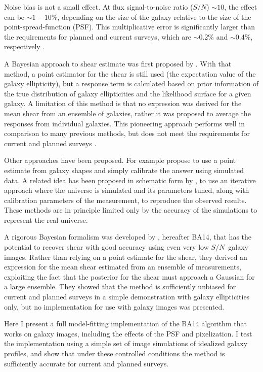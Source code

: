 \documentclass[12pt,preprint]{aastex}
\newcommand{\sn}{$S/N$}
\begin{document}
Noise bias is not a small effect.  At flux signal-to-noise ratio (\sn) $\sim
10$, the effect can be $\sim1-10$\%, depending on the size of the galaxy
relative to the size of the point-spread-function (PSF).  This multiplicative
error is significantly larger than the requirements for planned and current
surveys, which are $\sim$0.2\% and $\sim$0.4\%, respectively
\citep{HutererSystematics06}.

A Bayesian approach to shear estimate was first proposed by \cite{Miller07}.
With that method, a point estimator for the shear is still used (the
expectation value of the galaxy ellipticity), but a response term is calculated
based on prior information of the true distribution of galaxy ellipticities and
the likelihood surface for a given galaxy.  A limitation of this method is that
no expression was derived for the mean shear from an ensemble of galaxies,
rather it was proposed to average the responses from individual galaxies.  This
pioneering approach performs well in comparison to many previous methods, but
does not meet the requirements for current and planned surveys \citep{ba14}.

Other approaches have been proposed. For example \cite{Zuntz13} propose to use
a point estimate from galaxy shapes and simply calibrate the answer using
simulated data.  A related idea has been proposed in schematic form by
\cite{Refregier13}, to use an iterative approach where the universe is
simulated and its parameters tuned, along with calibration parameters of the
measurement, to reproduce the observed results.  These methods are in principle
limited only by the accuracy of the simulations to represent the real universe.

A rigorous Bayesian formalism was developed by \cite{ba14}, hereafter BA14,
that has the potential to recover shear with good accuracy using even very low
\sn\ galaxy images.  Rather than relying on a point estimate for the shear,
they derived an expression for the mean shear estimated from an ensemble of
measurements, exploiting the fact that the posterior for the shear must
approach a Gaussian for a large ensemble.  They showed that the method is
sufficiently unbiased for current and planned surveys in a simple demonstration
with galaxy ellipticities only, but no implementation for use with galaxy
images was presented.

Here I present a full model-fitting implementation of the BA14 algorithm that
works on galaxy images, including the effects of the PSF and pixelization.  I
test the implementation using a simple set of image simulations of idealized
galaxy profiles, and show that under these controlled conditions the method
is sufficiently accurate for current and planned surveys.
\end{document}
